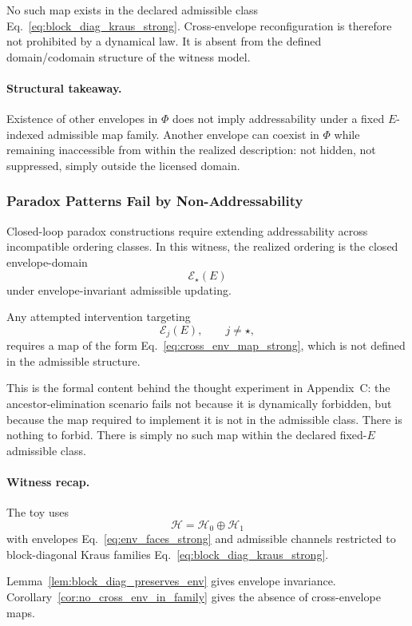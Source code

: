 \documentclass[aps,prx,onecolumn,11pt]{revtex4-2}
\theoremstyle{plain}
\theoremstyle{definition}
\theoremstyle{remark}
\begin{document}
No such map exists in the declared admissible class
Eq.~\eqref{eq:block_diag_kraus_strong}. Cross-envelope reconfiguration
is therefore not prohibited by a dynamical law. It is absent from the
defined domain/codomain structure of the witness model.

\paragraph{Structural takeaway.}

Existence of other envelopes in \(\Phi\) does not imply addressability
under a fixed \(E\)-indexed admissible map family. Another envelope can
coexist in \(\Phi\) while remaining inaccessible from within the
realized description: not hidden, not suppressed, simply outside the
licensed domain.

\subsubsection{Paradox Patterns Fail by Non-Addressability}
\label{subsubsec:paradox_fail_by_nonaddressability_strong}

Closed-loop paradox constructions require extending addressability
across incompatible ordering classes. In this witness, the realized
ordering is the closed envelope-domain
\[
\mathcal E_\star(E)
\]
under envelope-invariant admissible updating.

Any attempted intervention targeting
\[
\mathcal E_j(E),
\qquad
j\neq\star,
\]
requires a map of the form Eq.~\eqref{eq:cross_env_map_strong}, which is
not defined in the admissible structure.

This is the formal content behind the thought experiment in
Appendix~C: the ancestor-elimination scenario fails not because it is
dynamically forbidden, but because the map required to implement it is
not in the admissible class. There is nothing to forbid. There is
simply no such map within the declared fixed-\(E\) admissible class.

\paragraph{Witness recap.}

The toy uses
\[
\mathcal H=\mathcal H_0\oplus\mathcal H_1
\]
with envelopes Eq.~\eqref{eq:env_faces_strong} and admissible channels
restricted to block-diagonal Kraus families
Eq.~\eqref{eq:block_diag_kraus_strong}.

Lemma~\ref{lem:block_diag_preserves_env} gives envelope invariance.
Corollary~\ref{cor:no_cross_env_in_family} gives the absence of
cross-envelope maps.
\end{document}

